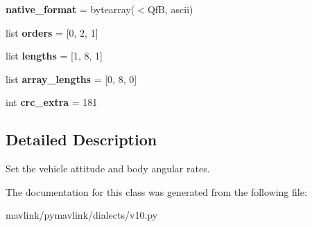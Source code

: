 \begin{DoxyCompactItemize}
{\bfseries native\+\_\+format} = bytearray(\textquotesingle{}$<$QfB\textquotesingle{}, \textquotesingle{}ascii\textquotesingle{})
\item 
\mbox{\label{classpymavlink_1_1dialects_1_1v10_1_1MAVLink__actuator__control__target__message_a58f6317aad45901aa43a3d8a439b6d34}} 
list {\bfseries orders} = \mbox{[}0, 2, 1\mbox{]}
\item 
\mbox{\label{classpymavlink_1_1dialects_1_1v10_1_1MAVLink__actuator__control__target__message_a4b05efdf6212745752362989690916c3}} 
list {\bfseries lengths} = \mbox{[}1, 8, 1\mbox{]}
\item 
\mbox{\label{classpymavlink_1_1dialects_1_1v10_1_1MAVLink__actuator__control__target__message_af227ad5fd143fc4da33a699c9ad5449a}} 
list {\bfseries array\+\_\+lengths} = \mbox{[}0, 8, 0\mbox{]}
\item 
\mbox{\label{classpymavlink_1_1dialects_1_1v10_1_1MAVLink__actuator__control__target__message_ad1edd8c6f0958e283a0c0977aff51eaf}} 
int {\bfseries crc\+\_\+extra} = 181
\end{DoxyCompactItemize}


\subsection{Detailed Description}
\begin{DoxyVerb}Set the vehicle attitude and body angular rates.
\end{DoxyVerb}
 

The documentation for this class was generated from the following file\+:\begin{DoxyCompactItemize}
\item 
mavlink/pymavlink/dialects/v10.\+py\end{DoxyCompactItemize}
